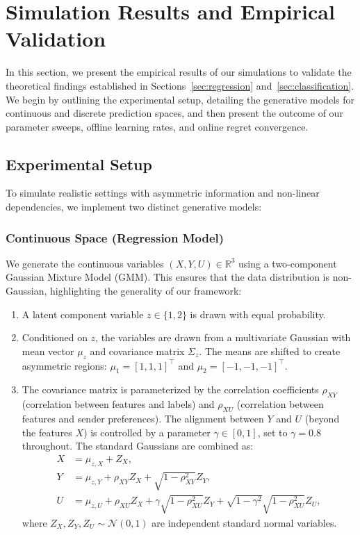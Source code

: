 \section{Simulation Results and Empirical Validation}
\label{sec:experiments}

In this section, we present the empirical results of our simulations to validate the theoretical findings established in Sections~\ref{sec:regression} and~\ref{sec:classification}. We begin by outlining the experimental setup, detailing the generative models for continuous and discrete prediction spaces, and then present the outcome of our parameter sweeps, offline learning rates, and online regret convergence.

\subsection{Experimental Setup}
To simulate realistic settings with asymmetric information and non-linear dependencies, we implement two distinct generative models:

\subsubsection{Continuous Space (Regression Model)}
We generate the continuous variables $(X, Y, U) \in \mathbb{R}^3$ using a two-component Gaussian Mixture Model (GMM). This ensures that the data distribution is non-Gaussian, highlighting the generality of our framework:
\begin{enumerate}
    \item A latent component variable $z \in \{1, 2\}$ is drawn with equal probability.
    \item Conditioned on $z$, the variables are drawn from a multivariate Gaussian with mean vector $\mu_z$ and covariance matrix $\Sigma_z$. The means are shifted to create asymmetric regions: $\mu_1 = [1, 1, 1]^\top$ and $\mu_2 = [-1, -1, -1]^\top$.
    \item The covariance matrix is parameterized by the correlation coefficients $\rho_{XY}$ (correlation between features and labels) and $\rho_{XU}$ (correlation between features and sender preferences). The alignment between $Y$ and $U$ (beyond the features $X$) is controlled by a parameter $\gamma \in [0, 1]$, set to $\gamma = 0.8$ throughout. The standard Gaussians are combined as:
    \begin{align}
        X &= \mu_{z, X} + Z_X, \\
        Y &= \mu_{z, Y} + \rho_{XY} Z_X + \sqrt{1 - \rho_{XY}^2} Z_Y, \\
        U &= \mu_{z, U} + \rho_{XU} Z_X + \gamma \sqrt{1 - \rho_{XU}^2} Z_Y + \sqrt{1 - \gamma^2} \sqrt{1 - \rho_{XU}^2} Z_U,
    \end{align}
    where $Z_X, Z_Y, Z_U \sim \mathcal{N}(0, 1)$ are independent standard normal variables.
\end{enumerate}

